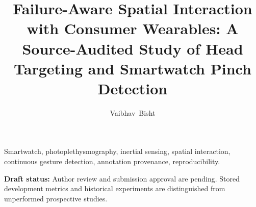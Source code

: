 \documentclass[journal]{IEEEtran}
\begin{document}
\title{Failure-Aware Spatial Interaction with Consumer Wearables: A Source-Audited Study of Head Targeting and Smartwatch Pinch Detection}
\author{Vaibhav~Bisht}
\maketitle
\begin{abstract}

\end{abstract}
\begin{IEEEkeywords}
Smartwatch, photoplethysmography, inertial sensing, spatial interaction, continuous gesture detection, annotation provenance, reproducibility.
\end{IEEEkeywords}
\noindent\textbf{Draft status:} Author review and submission approval are pending. Stored development metrics and historical experiments are distinguished from unperformed prospective studies.



\end{document}
